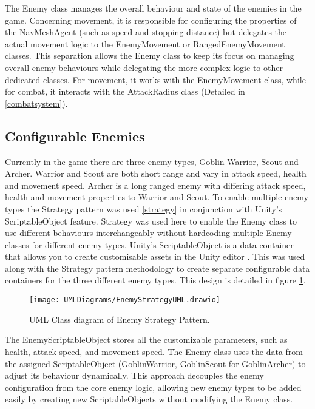 \documentclass[10pt]{final_report}
\begin{document}
The Enemy class manages the overall behaviour and state of the enemies in the game. Concerning movement, it is responsible for configuring the properties of the NavMeshAgent (such as speed and stopping distance) but delegates the actual movement logic to the EnemyMovement or RangedEnemyMovement classes. This separation allows the Enemy class to keep its focus on managing overall enemy behaviours while delegating the more complex logic to other dedicated classes. For movement, it works with the EnemyMovement class, while for combat, it interacts with the AttackRadius class (Detailed in \ref{combatsystem}). 

\subsection{Configurable Enemies}
Currently in the game there are three enemy types, Goblin Warrior, Scout and Archer. Warrior and Scout are both  short range and vary in attack speed, health and movement speed. Archer is a long ranged enemy with differing attack speed, health and movement properties to Warrior and Scout. To enable multiple enemy types the Strategy pattern was used \ref{strategy} in conjunction with Unity's ScriptableObject feature. Strategy was used here to enable the Enemy class to use different behaviours interchangeably without hardcoding multiple Enemy classes for different enemy types. Unity's ScriptableObject is a data container that allows you to create customisable assets in the Unity editor \cite{unity2024_ScriptableObject}. This was used along with the Strategy pattern methodology to create separate configurable data containers for the three different enemy types. This design is detailed in figure \ref{fig:label_strategy}.
\begin{figure}[H]
    \centering
    \texttt{[image: UMLDiagrams/EnemyStrategyUML.drawio]}
    \caption{UML Class diagram of Enemy Strategy Pattern.}
    \label{fig:label_strategy}
\end{figure}
The EnemyScriptableObject stores all the customizable parameters, such as health, attack speed, and movement speed. The Enemy class uses the data from the assigned ScriptableObject (GoblinWarrior, GoblinScout for GoblinArcher) to adjust its behaviour dynamically. This approach decouples the enemy configuration from the core enemy logic, allowing new enemy types to be added easily by creating new ScriptableObjects without modifying the Enemy class. 
\end{document}
